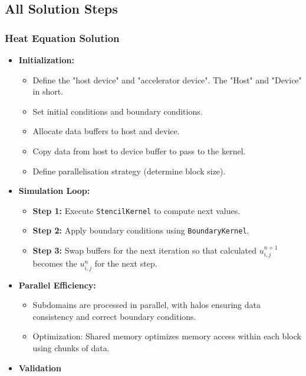 \documentclass[9pt]{beamer}
\begin{document}
\subsection{All Solution Steps}
\begin{frame}
\frametitle{Heat Equation Solution}
\begin{itemize}
    \item \textbf{Initialization:}
    \begin{itemize}
        \item Define the "host device" and "accelerator device". The "Host" and "Device" in short.
        \item Set initial conditions and boundary conditions.
        \item Allocate data buffers to host and device.
        \item Copy data from host to device buffer to pass to the kernel.
        \item Define parallelisation strategy (determine block size).
    \end{itemize}
    \item \textbf{Simulation Loop:}
    \begin{itemize}
        \item \textbf{Step 1:} Execute \texttt{StencilKernel} to compute next values.
        \item \textbf{Step 2:} Apply boundary conditions using \texttt{BoundaryKernel}.
        \item \textbf{Step 3:} Swap buffers for the next iteration so that calculated  $u_{i,j}^{n+1}$ becomes the $u_{i,j}^{n}$ for the next step.
    \end{itemize}
    \item \textbf{Parallel Efficiency:}
    \begin{itemize}
        \item Subdomains are processed in parallel, with halos ensuring data consistency and correct boundary conditions.
        \item Optimization: Shared memory optimizes memory access within each block using chunks of data.
    \end{itemize}
    \item \textbf{Validation}
\end{itemize}
\end{frame}
\end{document}
